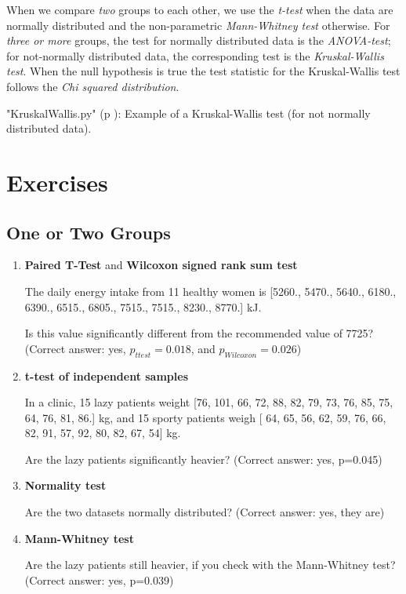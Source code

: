 When we compare \emph{two} groups to each other, we use the \emph{t-test} when the data are normally distributed and the non-parametric \emph{Mann-Whitney test} otherwise. For \emph{three or more }groups, the test for normally distributed data is the \emph{ANOVA-test}; for not-normally distributed data, the corresponding test is the \emph{Kruskal-Wallis test}. When the null hypothesis is true the test statistic for the Kruskal-Wallis test follows the \emph{Chi squared distribution}.

\PyImg "KruskalWallis.py" (p \pageref{py:KruskalWallis}): Example of a Kruskal-Wallis test (for not normally distributed data).

\section{Exercises}

\subsection*{One or Two Groups}

\begin{enumerate}
  \item \textbf{Paired T-Test} and \textbf{Wilcoxon signed rank sum test}

The daily energy intake from 11 healthy women is [5260., 5470., 5640., 6180., 6390., 6515., 6805., 7515., 7515., 8230., 8770.] kJ.

    Is this value significantly different from the recommended value of 7725?
    (Correct answer: yes, $p_{ttest}=0.018$, and $p_{Wilcoxon}=0.026$)

  \item \textbf{t-test of independent samples}

In a clinic, 15 lazy patients weight [76, 101, 66, 72, 88, 82, 79, 73, 76, 85, 75, 64, 76, 81, 86.] kg, and 15 sporty patients weigh [ 64, 65, 56, 62, 59, 76, 66, 82, 91, 57, 92, 80, 82, 67, 54] kg.

    Are the lazy patients significantly heavier?
    (Correct answer: yes, p=0.045)

  \item \textbf{Normality test}

    Are the two datasets normally distributed?
    (Correct answer: yes, they are)

  \item \textbf{Mann-Whitney test}

    Are the lazy patients still heavier, if you check with the Mann-Whitney test?
    (Correct answer: yes, p=0.039)
\end{enumerate}

